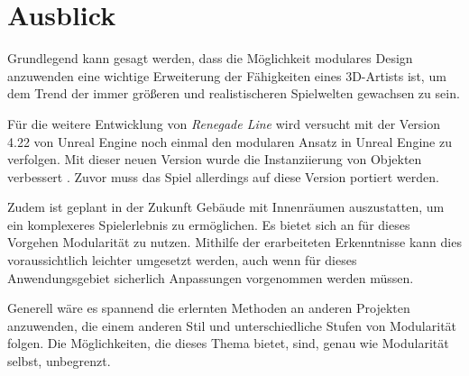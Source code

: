 \section{Ausblick}
Grundlegend kann gesagt werden, dass die Möglichkeit modulares Design anzuwenden eine wichtige Erweiterung der Fähigkeiten eines 3D-Artists ist, um dem Trend der immer größeren und realistischeren Spielwelten gewachsen zu sein.
\par
Für die weitere Entwicklung von \textit{Renegade Line} wird versucht mit der Version 4.22 von Unreal Engine noch einmal den modularen Ansatz in Unreal Engine zu verfolgen. Mit dieser neuen Version wurde die Instanziierung von Objekten verbessert \parencite{unrealTalk}. Zuvor muss das Spiel allerdings auf diese Version portiert werden.
\par
Zudem ist geplant in der Zukunft Gebäude mit Innenräumen auszustatten, um ein komplexeres Spielerlebnis zu ermöglichen. Es bietet sich an für dieses Vorgehen Modularität zu nutzen. Mithilfe der erarbeiteten Erkenntnisse kann dies voraussichtlich leichter umgesetzt werden, auch wenn für dieses Anwendungsgebiet sicherlich Anpassungen vorgenommen werden müssen.
\par
Generell wäre es spannend die erlernten Methoden an anderen Projekten anzuwenden, die einem anderen Stil und unterschiedliche Stufen von Modularität folgen. Die Möglichkeiten, die dieses Thema bietet, sind, genau wie Modularität selbst, unbegrenzt.